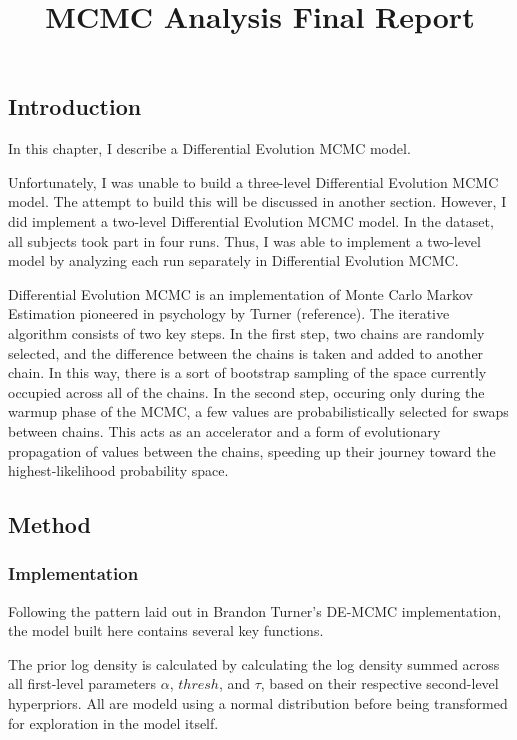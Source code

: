 \documentclass[]{article}
\title{MCMC Analysis Final Report}
\author{}
\date{}
\begin{document}
\maketitle

\subsection{Introduction}\label{introduction}

In this chapter, I describe a Differential Evolution MCMC model.

Unfortunately, I was unable to build a three-level Differential
Evolution MCMC model. The attempt to build this will be discussed in
another section. However, I did implement a two-level Differential
Evolution MCMC model. In the dataset, all subjects took part in four
runs. Thus, I was able to implement a two-level model by analyzing each
run separately in Differential Evolution MCMC.

Differential Evolution MCMC is an implementation of Monte Carlo Markov
Estimation pioneered in psychology by Turner (reference). The iterative
algorithm consists of two key steps. In the first step, two chains are
randomly selected, and the difference between the chains is taken and
added to another chain. In this way, there is a sort of bootstrap
sampling of the space currently occupied across all of the chains. In
the second step, occuring only during the warmup phase of the MCMC, a
few values are probabilistically selected for swaps between chains. This
acts as an accelerator and a form of evolutionary propagation of values
between the chains, speeding up their journey toward the
highest-likelihood probability space.

\subsection{Method}\label{method}

\subsubsection{Implementation}\label{implementation}

Following the pattern laid out in Brandon Turner's DE-MCMC
implementation, the model built here contains several key functions.

The prior log density is calculated by calculating the log density
summed across all first-level parameters \(\alpha\), \(thresh\), and
\(\tau\), based on their respective second-level hyperpriors. All are
modeld using a normal distribution before being transformed for
exploration in the model itself.
\end{document}
